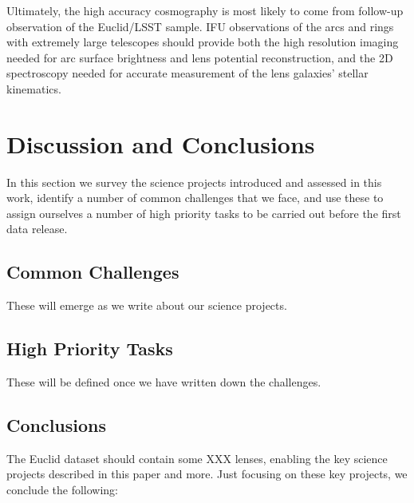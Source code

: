 \documentclass[twocolumn]{svjour3}
\begin{document}
Ultimately, the high accuracy cosmography is most likely to come from
follow-up observation of the Euclid/LSST sample. IFU observations of the
arcs and rings with extremely large telescopes should provide both the
high resolution imaging needed for arc surface brightness and lens
potential reconstruction, and the 2D spectroscopy needed for accurate
measurement of the lens galaxies' stellar kinematics.\\




\vspace{30pt}



\section{Discussion and Conclusions}
\label{sec:conclusions}

In this section we survey the science projects introduced and assessed
in this  work, identify a number of common challenges that we face, and
use these to  assign ourselves a number of high priority tasks to be
carried out before the first data release.

\subsection{Common Challenges}

These will emerge as we write about our science projects.


\subsection{High Priority Tasks}

These will be defined once we have written down the challenges.


\subsection{Conclusions}

The Euclid dataset should contain some XXX lenses, enabling the key
science projects described in this paper and more. Just focusing on
these key projects, we conclude the following:
\end{document}

